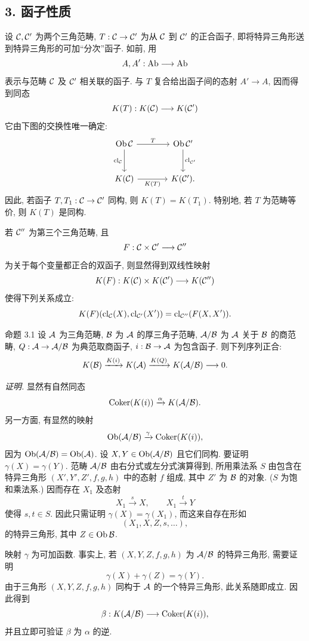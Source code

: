 \subsection*{3. 函子性质}

设 $\mathcal C,\mathcal C'$ 为两个三角范畴, $T:\mathcal C\to\mathcal C'$ 为从 $\mathcal C$ 到 $\mathcal C'$ 的正合函子, 即将特异三角形送到特异三角形的可加“分次”函子. 如前, 用
\[
A,A':\operatorname{Ab}\longrightarrow\operatorname{Ab}
\]
表示与范畴 $\mathcal C$ 及 $\mathcal C'$ 相关联的函子. 与 $T$ 复合给出函子间的态射 $A'\to A$, 因而得到同态
\[
K(T):K(\mathcal C)\longrightarrow K(\mathcal C')
\]
它由下图的交换性唯一确定:
\[
\begin{tikzcd}[column sep=large,row sep=large]
\Ob\cC \arrow[r,"T"] \arrow[d,"\operatorname{cl}_{\cC}"']&
\Ob\cC' \arrow[d,"\operatorname{cl}_{\cC'}"]\\
K(\cC) \arrow[r,"K(T)"']& K(\cC').
\end{tikzcd}
\]
因此, 若函子 $T,T_1:\mathcal C\to\mathcal C'$ 同构, 则 $K(T)=K(T_1)$. 特别地, 若 $T$ 为范畴等价, 则 $K(T)$ 是同构.

若 $\mathcal C''$ 为第三个三角范畴, 且
\[
F:\mathcal C\times\mathcal C'\longrightarrow \mathcal C''
\]
为关于每个变量都正合的双函子, 则显然得到双线性映射
\[
K(F):K(\mathcal C)\times K(\mathcal C')\longrightarrow K(\mathcal C'')
\]
使得下列关系成立:
\[
K(F)(\operatorname{cl}_{\mathcal C}(X),\operatorname{cl}_{\mathcal C'}(X'))
=
\operatorname{cl}_{\mathcal C''}(F(X,X')).
\]

\begin{statement}{命题 3.1}
设 $\mathcal A$ 为三角范畴, $\mathcal B$ 为 $\mathcal A$ 的厚三角子范畴, $\mathcal A/\mathcal B$ 为 $\mathcal A$ 关于 $\mathcal B$ 的商范畴, $Q:\mathcal A\to\mathcal A/\mathcal B$ 为典范取商函子, $i:\mathcal B\to\mathcal A$ 为包含函子. 则下列序列正合:
\[
K(\mathcal B)\xrightarrow{K(i)}K(\mathcal A)\xrightarrow{K(Q)}K(\mathcal A/\mathcal B)\longrightarrow 0.
\]
\end{statement}

\emph{证明.} 显然有自然同态
\[
\operatorname{Coker}(K(i))\xrightarrow{\alpha}K(\mathcal A/\mathcal B).
\]
另一方面, 有显然的映射
\[
\operatorname{Ob}(\mathcal A/\mathcal B)\xrightarrow{\gamma}\operatorname{Coker}(K(i)),
\]
因为 $\operatorname{Ob}(\mathcal A/\mathcal B)=\operatorname{Ob}(\mathcal A)$. 设 $X,Y\in\operatorname{Ob}(\mathcal A/\mathcal B)$ 且它们同构. 要证明 $\gamma(X)=\gamma(Y)$. 范畴 $\mathcal A/\mathcal B$ 由右分式或左分式演算得到, 所用乘法系 $S$ 由包含在特异三角形 $(X',Y',Z',f,g,h)$ 中的态射 $f$ 组成, 其中 $Z'$ 为 $\mathcal B$ 的对象. ($S$ 为饱和乘法系.) 因而存在 $X_1$ 及态射
\[
X_1\xrightarrow{s}X,\qquad X_1\xrightarrow{t}Y
\]
使得 $s,t\in S$. 因此只需证明 $\gamma(X)=\gamma(X_1)$, 而这来自存在形如
\[
(X_1,X,Z,s,\ldots),
\]
的特异三角形, 其中 $Z\in\operatorname{Ob}\mathcal B$.

映射 $\gamma$ 为可加函数. 事实上, 若 $(X,Y,Z,f,g,h)$ 为 $\mathcal A/\mathcal B$ 的特异三角形, 需要证明
\[
\gamma(X)+\gamma(Z)=\gamma(Y).
\]
由于三角形 $(X,Y,Z,f,g,h)$ 同构于 $\mathcal A$ 的一个特异三角形, 此关系随即成立. 因此得到
\[
\beta:K(\mathcal A/\mathcal B)\longrightarrow \operatorname{Coker}(K(i)),
\]
并且立即可验证 $\beta$ 为 $\alpha$ 的逆.

